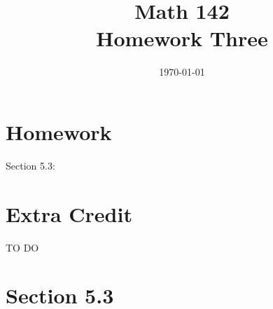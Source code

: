 \documentclass{exam}
\author{}
\date{\today}
\title{Math 142 \\ Homework Three}
\begin{document}
  \maketitle

  \section{Homework}
  Section 5.3: 

  \section{Extra Credit}
  TO DO

  \ifprintanswers

    \section{Section 5.3}
\end{document}
